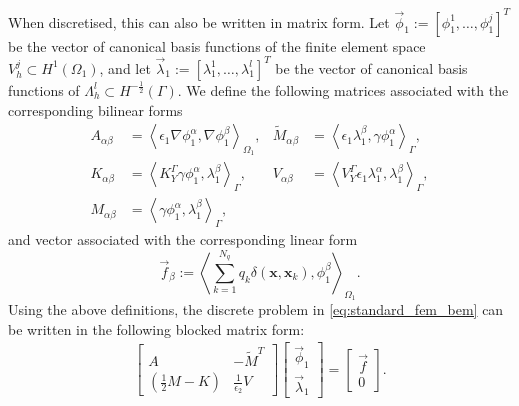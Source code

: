 When discretised, this can also be written in matrix form. Let $\vec{\phi}_1 := [\phi_1^1, \dots, \phi_1^j]^T$ be the vector of canonical basis
functions of the finite element space $V_{h}^{j}\subset H^1(\Omega_1)$, %
and let $\vec{\lambda}_1 := [\lambda_1^1, \dots, \lambda_1^l]^T$ be the vector of canonical basis
functions of $\Lambda_{h}^{l}\subset H^{-\frac{1}{2}}(\Gamma)$. %
We define the following matrices associated with the corresponding bilinear forms
\begin{align*}
A_{\alpha \beta} &= \left\langle\epsilon_1\nabla\phi_1^{\alpha}, \nabla \phi_1^{\beta} \right\rangle_{\Omega_1},&
\tilde{M}_{\alpha \beta} &= \left\langle \epsilon_1\lambda^{\beta}_1, \gamma \phi_1^{\alpha}\right\rangle_{\Gamma},\\
K_{\alpha \beta} &= \left\langle K_{Y}^{\Gamma} \gamma \phi^{\alpha}_1, \lambda^{\beta}_1 \right\rangle_{\Gamma},&
V_{\alpha \beta} &= \left\langle V_{Y}^{\Gamma} \epsilon_1\lambda^{\alpha}_1, \lambda^{\beta}_1 \right\rangle_{\Gamma},\\
M_{\alpha \beta} &= \left\langle \gamma \phi^{\alpha}_1, \lambda^{\beta}_1 \right\rangle_{\Gamma},
\end{align*}
and vector associated with the corresponding linear form
\begin{equation*}
\vec{f}_{\beta} := \left\langle  \sum_{k=1}^{N_q} q_k\delta(\mathbf{x},\mathbf{x}_k),  \phi_1^{\beta} \right\rangle_{\Omega_1}.
\end{equation*}
Using the above definitions, the discrete problem in \eqref{eq:standard_fem_bem} can be written in the following blocked matrix form:
\begin{align}\label{eq:fembem_matrix}
\begin{bmatrix}
A & -\tilde{M}^T \\  
\left(\tfrac12 M - K \right) &  \tfrac{1}{\epsilon_2} V 
\end{bmatrix}
\begin{bmatrix}
\vec{\phi}_1 \\  
\vec{\lambda}_1
\end{bmatrix}
= 
\begin{bmatrix}
\vec{f} \\  
0
\end{bmatrix}.
\end{align}

